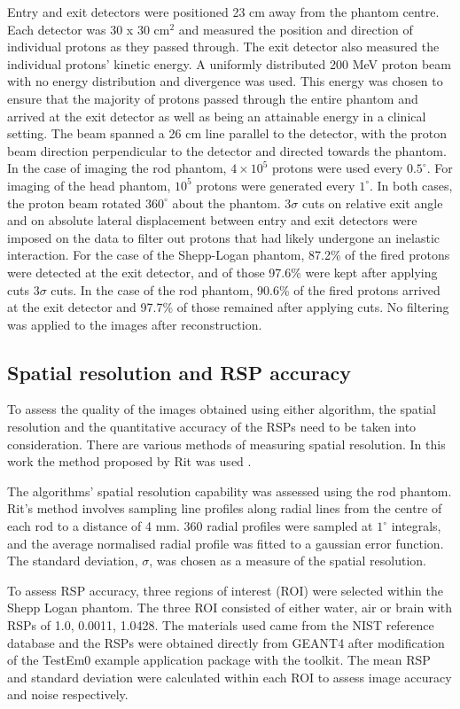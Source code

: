 \documentclass[11pt,a4paper]{article}
\begin{document}
Entry and exit detectors were positioned 23 cm away from the phantom centre. Each detector was 30 x 30 cm$^2$ and measured the position and direction of individual protons as they passed through. The exit detector also measured the individual protons' kinetic energy. A uniformly distributed 200 MeV proton beam with no energy distribution and divergence was used. This energy was chosen to ensure that the majority of protons passed through the entire phantom and arrived at the exit detector as well as being an attainable energy in a clinical setting. The beam spanned a 26 cm line parallel to the detector, with the proton beam direction perpendicular to the detector and directed towards the phantom. In the case of imaging the rod phantom, $4 \times 10^5$ protons were used every $0.5^{\circ}$. For imaging of the head phantom, $10^5$ protons were generated every $1^{\circ}$. In both cases, the proton beam rotated $360^{\circ}$ about the phantom. $3\sigma$ cuts on relative exit angle and on absolute lateral displacement between entry and exit detectors were imposed on the data to filter out protons that had likely undergone an inelastic interaction. For the case of the Shepp-Logan phantom, 87.2\% of the fired protons were detected at the exit detector, and of those 97.6\% were kept after applying cuts $3\sigma$ cuts. In the case of the rod phantom, 90.6\% of the fired protons arrived at the exit detector and 97.7\% of those remained after applying cuts. No filtering was applied to the images after reconstruction.


\subsection{Spatial resolution and RSP accuracy}
To assess the quality of the images obtained using either algorithm, the spatial resolution and the quantitative accuracy of the RSPs need to be taken into consideration. There are various methods of measuring spatial resolution. In this work the method proposed by Rit was used \parencite{rit2015list}.

The algorithms' spatial resolution capability was assessed using the rod phantom. Rit's method involves sampling line profiles along radial lines from the centre of each rod to a distance of 4 mm. 360 radial profiles were sampled at $1^{\circ}$ integrals, and the average normalised radial profile was fitted to a gaussian error function. The standard deviation, $\sigma$, was chosen as a measure of the spatial resolution. 

To assess RSP accuracy, three regions of interest (ROI) were selected within the Shepp Logan phantom. The three ROI consisted of either water, air or brain with RSPs of 1.0, 0.0011, 1.0428. The materials used came from the NIST reference database \parencite{nist} and the RSPs were obtained directly from GEANT4 after modification of the TestEm0 example application package with the toolkit. The mean RSP and standard deviation were calculated within each ROI to assess image accuracy and noise respectively. 
\end{document}
